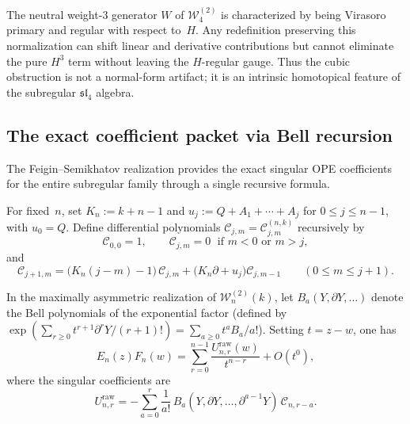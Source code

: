 \begin{remark}
\label{rem:w-w4-cubic-essential}
The neutral weight-$3$ generator $W$ of $\mathcal{W}_4^{(2)}$ is
characterized by being Virasoro primary and regular with respect
to~$H$.  Any redefinition preserving this normalization can shift
linear and derivative contributions but cannot eliminate the pure
$H^3$ term without leaving the $H$-regular gauge.  Thus the cubic
obstruction is not a normal-form artifact; it is an intrinsic
homotopical feature of the subregular $\mathfrak{sl}_4$ algebra.
\end{remark}

\subsection{The exact coefficient packet via Bell recursion}
\label{subsec:exact-bell-recursion}

The Feigin--Semikhatov realization provides the exact singular OPE
coefficients for the entire subregular family through a single
recursive formula.

\begin{definition}
\label{def:w-recursive-coefficient-operators}
For fixed~$n$, set $K_n := k + n - 1$ and
$u_j := Q + A_1 + \cdots + A_j$ for $0 \le j \le n-1$, with
$u_0 = Q$.  Define differential polynomials
$\mathcal{C}_{j,m} = \mathcal{C}_{j,m}^{(n,k)}$ recursively by
\[
\mathcal{C}_{0,0} = 1, \qquad
\mathcal{C}_{j,m} = 0 \;\text{ if } m < 0 \text{ or } m > j,
\]
and
\[
\mathcal{C}_{j+1,m}
= \bigl(K_n(j-m) - 1\bigr)\,\mathcal{C}_{j,m}
+ \bigl(K_n\partial + u_j\bigr)\mathcal{C}_{j,m-1}
\qquad (0 \le m \le j+1).
\]
\end{definition}

\begin{theorem}
\label{thm:w-full-raw-coefficient-packet}
In the maximally asymmetric realization of
$\mathcal{W}_n^{(2)}(k)$, let $B_a(Y, \partial Y, \dots)$ denote
the Bell polynomials of the exponential factor (defined by
$\exp(\sum_{r \ge 0} t^{r+1}\partial^r Y/(r+1)!)
= \sum_{a \ge 0} t^a B_a/a!$).  Setting $t = z - w$, one has
\[
E_n(z)F_n(w)
= \sum_{r=0}^{n-1} \frac{U_{n,r}^{\mathrm{raw}}(w)}{t^{n-r}}
  + O(t^0),
\]
where the singular coefficients are
\[
U_{n,r}^{\mathrm{raw}}
= -\sum_{a=0}^{r} \frac{1}{a!}\,
  B_a(Y, \partial Y, \dots, \partial^{a-1}Y)\,
  \mathcal{C}_{n,r-a}.
\]
\end{theorem}

